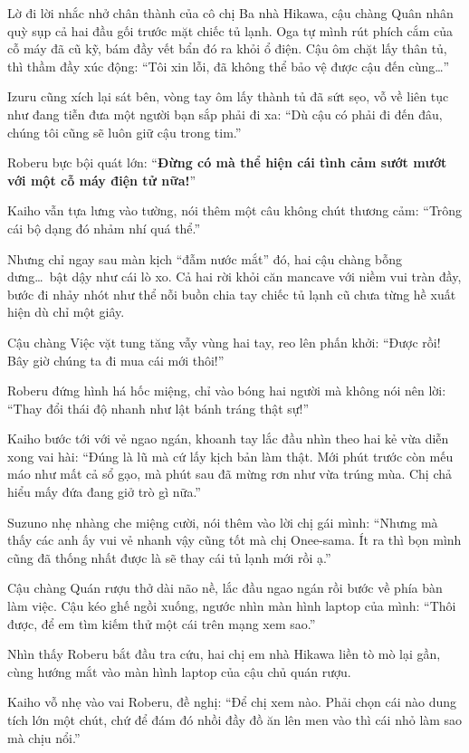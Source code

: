 \documentclass[../main.tex]{subfiles}
\begin{document}
Lờ đi lời nhắc nhở chân thành của cô chị Ba nhà Hikawa, cậu chàng Quân nhân quỳ sụp cả hai đầu gối trước mặt chiếc tủ lạnh. Oga tự mình rút phích cắm của cỗ máy đã cũ kỹ, bám đầy vết bẩn đó ra khỏi ổ điện. Cậu ôm chặt lấy thân tủ, thì thầm đầy xúc động: ``Tôi xin lỗi, đã không thể bảo vệ được cậu đến cùng\dots''

Izuru cũng xích lại sát bên, vòng tay ôm lấy thành tủ đã sứt sẹo, vỗ về liên tục như đang tiễn đưa một người bạn sắp phải đi xa: ``Dù cậu có phải đi đến đâu, chúng tôi cũng sẽ luôn giữ cậu trong tim.''


Roberu bực bội quát lớn: ``\textbf{Đừng có mà thể hiện cái tình cảm sướt mướt với một cỗ máy điện tử nữa!}''

Kaiho vẫn tựa lưng vào tường, nói thêm một câu không chút thương cảm: ``Trông cái bộ dạng đó nhảm nhí quá thể.''

Nhưng chỉ ngay sau màn kịch ``đẫm nước mắt'' đó, hai cậu chàng bỗng dưng\dots\ bật dậy như cái lò xo. Cả hai rời khỏi căn mancave với niềm vui tràn đầy, bước đi nhảy nhót như thể nỗi buồn chia tay chiếc tủ lạnh cũ chưa từng hề xuất hiện dù chỉ một giây.

Cậu chàng Việc vặt tung tăng vẫy vùng hai tay, reo lên phấn khởi: ``Được rồi! Bây giờ chúng ta đi mua cái mới thôi!''

Roberu đứng hình há hốc miệng, chỉ vào bóng hai người mà không nói nên lời: ``Thay đổi thái độ nhanh như lật bánh tráng thật sự!''

Kaiho bước tới với vẻ ngao ngán, khoanh tay lắc đầu nhìn theo hai kẻ vừa diễn xong vai hài: ``Đúng là lũ mà cứ lấy kịch bản làm thật. Mới phút trước còn mếu máo như mất cả sổ gạo, mà phút sau đã mừng rơn như vừa trúng mùa. Chị chả hiểu mấy đứa đang giở trò gì nữa.''

Suzuno nhẹ nhàng che miệng cười, nói thêm vào lời chị gái mình: ``Nhưng mà thấy các anh ấy vui vẻ nhanh vậy cũng tốt mà chị Onee-sama. Ít ra thì bọn mình cũng đã thống nhất được là sẽ thay cái tủ lạnh mới rồi ạ.''

Cậu chàng Quán rượu thở dài não nề, lắc đầu ngao ngán rồi bước về phía bàn làm việc. Cậu kéo ghế ngồi xuống, ngước nhìn màn hình laptop của mình: ``Thôi được, để em tìm kiếm thử một cái trên mạng xem sao.''

Nhìn thấy Roberu bắt đầu tra cứu, hai chị em nhà Hikawa liền tò mò lại gần, cùng hướng mắt vào màn hình laptop của cậu chủ quán rượu.

Kaiho vỗ nhẹ vào vai Roberu, đề nghị: ``Để chị xem nào. Phải chọn cái nào dung tích lớn một chút, chứ để đám đó nhồi đầy đồ ăn lên men vào thì cái nhỏ làm sao mà chịu nổi.''
\end{document}

